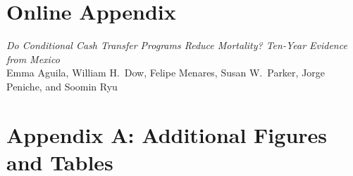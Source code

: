 \documentclass[12pt]{article}
\begin{document}
\setcounter{secnumdepth}{0}
\bigskip
\singlespace
\renewcommand{\bibname}{References}
{\linespread{1.0}\selectfont}


\newpage



\newpage


\appendix

\newpage
\setcounter{page}{1}
\section*{Online Appendix}\label{appOnline}
\vspace{2cm}
\begin{center}
{\Large \it Do Conditional Cash Transfer Programs Reduce Mortality? Ten-Year Evidence from Mexico} \\[.4cm]
Emma Aguila, William H.\ Dow, Felipe Menares, Susan W.\ Parker, Jorge Peniche, and Soomin Ryu
\end{center}
\listoffigures
\listoftables

\newpage
\section*{Appendix A: Additional Figures and Tables}\label{appA}
\setcounter{table}{0}
\renewcommand{\thetable}{A.\arabic{table}}
\setcounter{figure}{0}
\renewcommand{\thefigure}{A.\arabic{figure}}
\renewcommand{\thesubsection}{\Alph{subsection}}



  
\end{document}
